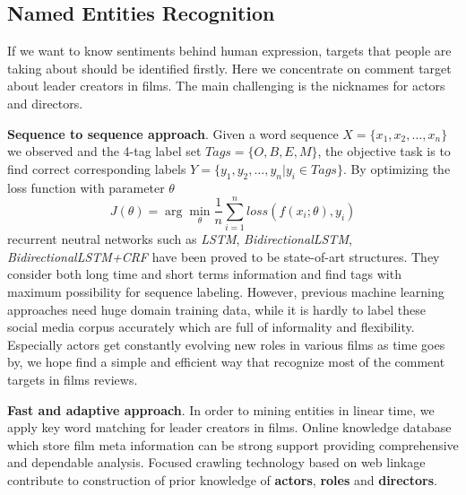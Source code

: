 \subsection{Named Entities Recognition}
\par If we want to know sentiments behind human expression, targets that people are taking about should be identified firstly. Here we concentrate on comment target about leader creators in films. The main challenging is the nicknames for actors and directors.
\par \textbf{Sequence to sequence approach}. Given a word sequence $X=\{x_1, x_2, \dots, x_n\}$ we observed and the 4-tag label set $Tags=\{O,B,E,M\}$, the objective task is to find correct corresponding labels $Y=\{y_1, y_2, \dots, y_n | y_i \in Tags\} $. By optimizing the loss function with parameter $ \theta $
\begin{equation}
    J(\theta)= \arg\min_{\theta} \frac{1}{n}\sum_{i=1}^{n}loss(f(x_i;\theta), y_i)
\end{equation}
recurrent neutral networks such as \emph{LSTM}, \emph{BidirectionalLSTM}, \emph{BidirectionalLSTM+CRF} \cite{chen2017improving} have been proved to be state-of-art structures. They consider both long time and short terms information and find tags with maximum possibility for sequence labeling. However, previous machine learning approaches need huge domain training data, while it is hardly to label these social media corpus accurately which are full of informality and flexibility. Especially actors get constantly evolving new roles in various films as time goes by, we hope find a simple and efficient way that recognize most of the comment targets in films reviews.
\par \textbf{Fast and adaptive approach}. In order to mining entities in linear time, we apply key word matching for leader creators in films. Online knowledge database which store film meta information can be strong support providing comprehensive and dependable analysis. Focused crawling technology based on web linkage contribute to construction of prior knowledge of \textbf{actors}, \textbf{roles} and \textbf{directors}.

